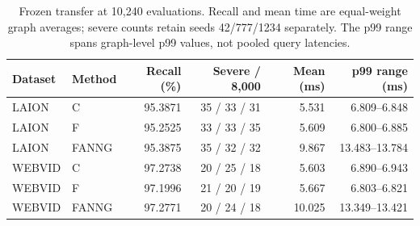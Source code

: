 \begin{table}[t]
\centering
\caption{Frozen transfer at 10,240 evaluations. Recall and mean time are equal-weight graph averages; severe counts retain seeds 42/777/1234 separately. The p99 range spans graph-level p99 values, not pooled query latencies.}
\label{tab:transfer}
\small
\begin{tabular}{@{}llrrrr@{}}
\toprule
Dataset & Method & Recall (\%) & Severe / 8,000 & Mean (ms) & p99 range (ms) \\
\midrule
LAION & C & 95.3871 & 35 / 33 / 31 & 5.531 & 6.809--6.848 \\
LAION & F & 95.2525 & 33 / 33 / 35 & 5.609 & 6.800--6.885 \\
LAION & FANNG & 95.3875 & 35 / 32 / 32 & 9.867 & 13.483--13.784 \\
WEBVID & C & 97.2738 & 20 / 25 / 18 & 5.603 & 6.890--6.943 \\
WEBVID & F & 97.1996 & 21 / 20 / 19 & 5.667 & 6.803--6.821 \\
WEBVID & FANNG & 97.2771 & 20 / 24 / 18 & 10.025 & 13.349--13.421 \\
\bottomrule
\end{tabular}
\end{table}
